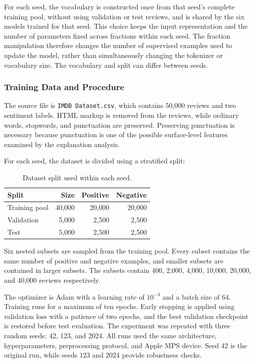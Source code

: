 \documentclass[11pt]{article}
\begin{document}
For each seed, the vocabulary is constructed once from that seed's complete training pool, without using validation or test reviews, and is shared by the six models trained for that seed. This choice keeps the input representation and the number of parameters fixed across fractions within each seed. The fraction manipulation therefore changes the number of supervised examples used to update the model, rather than simultaneously changing the tokenizer or vocabulary size. The vocabulary and split can differ between seeds.

\subsubsection{Training Data and Procedure}

The source file is \texttt{IMDB Dataset.csv}, which contains 50,000 reviews and two sentiment labels. HTML markup is removed from the reviews, while ordinary words, stopwords, and punctuation are preserved. Preserving punctuation is necessary because punctuation is one of the possible surface-level features examined by the explanation analysis.

For each seed, the dataset is divided using a stratified split:

\begin{table}[htbp]
\centering
\caption{Dataset split used within each seed.}
\label{tab:split}
\begin{tabular}{lrrr}
\toprule
Split & Size & Positive & Negative \\
\midrule
Training pool & 40,000 & 20,000 & 20,000 \\
Validation & 5,000 & 2,500 & 2,500 \\
Test & 5,000 & 2,500 & 2,500 \\
\bottomrule
\end{tabular}
\end{table}

Six nested subsets are sampled from the training pool. Every subset contains the same number of positive and negative examples, and smaller subsets are contained in larger subsets. The subsets contain 400, 2,000, 4,000, 10,000, 20,000, and 40,000 reviews respectively.

The optimizer is Adam with a learning rate of $10^{-3}$ and a batch size of 64. Training runs for a maximum of ten epochs. Early stopping is applied using validation loss with a patience of two epochs, and the best validation checkpoint is restored before test evaluation. The experiment was repeated with three random seeds: 42, 123, and 2024. All runs used the same architecture, hyperparameters, preprocessing protocol, and Apple MPS device. Seed 42 is the original run, while seeds 123 and 2024 provide robustness checks.
\end{document}
